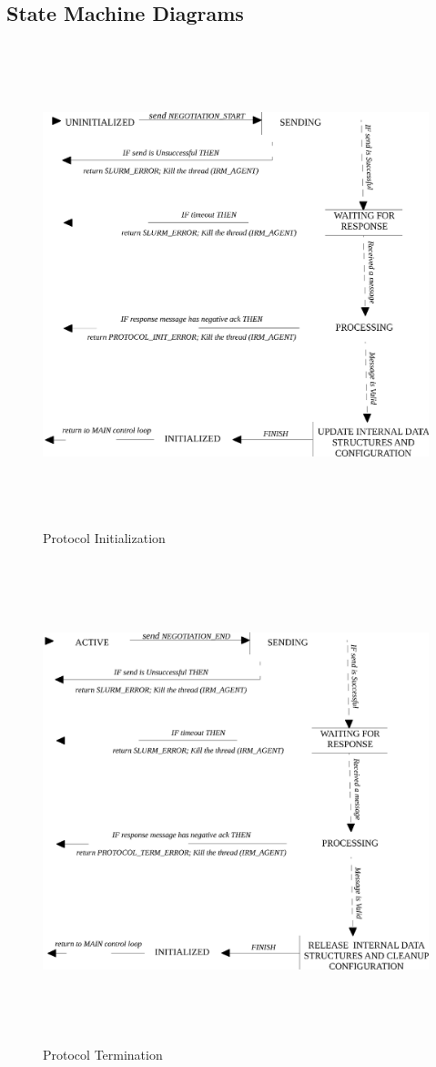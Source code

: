 \documentclass[a4paper, 12pt]{article}
\begin{document}
\subsection{State Machine Diagrams}
\vspace{10mm}
\begin{figure}[h]
\centering
\includegraphics[width=1.0\textwidth, height=140mm]{./Init.eps}
\caption{Protocol Initialization}
\label{fig:Init}
\end{figure}
\clearpage
\begin{figure}[h]
\centering
\includegraphics[width=1.0\textwidth, height=140mm]{./Term.eps}
\caption{Protocol Termination}
\label{fig:Term}
\end{figure}
\end{document}
